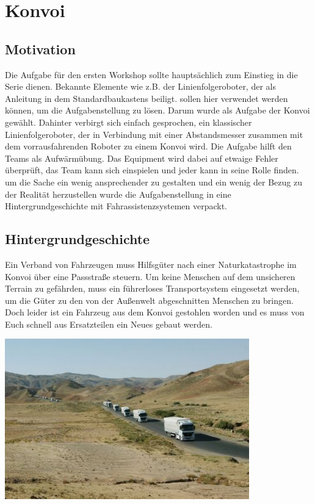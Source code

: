 \chapter{Konvoi}

  \section{Motivation}
    Die Aufgabe für den ersten Workshop sollte hauptsächlich zum Einstieg in die Serie dienen. Bekannte Elemente wie z.B. der Linienfolgeroboter, der als Anleitung in dem Standardbaukastens beiligt. sollen hier verwendet werden können, um die Aufgabenstellung zu lösen. Darum wurde als Aufgabe der Konvoi gewählt. Dahinter verbirgt sich einfach gesprochen, ein klassischer Linienfolgeroboter, der in Verbindung mit einer Abstandsmesser zusammen mit dem vorrausfahrenden Roboter zu einem Konvoi wird. Die Aufgabe hilft den Teams als Aufwärmübung. Das Equipment wird dabei auf etwaige Fehler überprüft, das Team kann sich einspielen und jeder kann in seine Rolle finden.
    \newline
    um die Sache ein wenig ansprechender zu gestalten und ein wenig der Bezug zu der Realität herzustellen wurde die Aufgabenstellung in eine Hintergrundgeschichte mit Fahrassistenzsystemen verpackt.

  \section{Hintergrundgeschichte}
    Ein Verband von Fahrzeugen muss Hilfsgüter nach einer Naturkatastrophe im Konvoi über eine Passstraße steuern. Um keine Menschen auf dem unsicheren Terrain zu gefährden, muss ein führerloses Transportsystem eingesetzt werden, um die Güter zu den von der Außenwelt abgeschnitten Menschen zu bringen. Doch leider ist ein Fahrzeug aus dem Konvoi gestohlen worden und es muss von Euch schnell aus Ersatzteilen ein Neues gebaut werden.

    \begin{capfigure}[Konvoi]
      \includegraphics[width=\textwidth]{images/konvoi}
    \end{capfigure}

